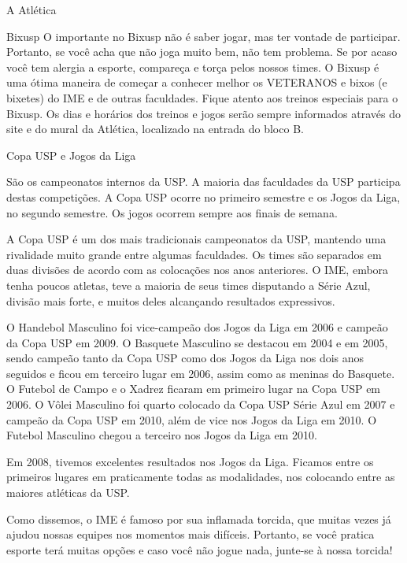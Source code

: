 \begin{secao}{A Atlética}
\begin{subsecao}{Bixusp}
O importante no Bixusp não é saber jogar, mas ter vontade de participar. Portanto, se você acha que não joga muito bem, não tem problema. Se por acaso você tem alergia a esporte, compareça e torça pelos nossos times. O Bixusp é uma ótima maneira de começar a conhecer melhor os VETERANOS e bixos (e bixetes) do IME e de outras faculdades. Fique atento aos treinos especiais para o Bixusp. Os dias e horários dos treinos e jogos serão sempre informados através do site e do mural da Atlética, localizado na entrada do bloco B.

  \end{subsecao}

  \begin{subsecao}{Copa USP e Jogos da Liga}

São os campeonatos internos da USP. A maioria das faculdades da USP participa destas competições. A Copa USP ocorre no primeiro semestre e os Jogos da Liga, no segundo semestre. Os jogos ocorrem sempre aos finais de semana.

A Copa USP é um dos mais tradicionais campeonatos da USP, mantendo uma rivalidade muito grande entre algumas faculdades. Os times são separados em duas divisões de acordo com as colocações nos anos anteriores. O IME, embora tenha poucos atletas, teve a maioria de seus times disputando a Série Azul, divisão mais forte, e muitos deles alcançando resultados expressivos.

O Handebol Masculino foi vice-campeão dos Jogos da Liga em 2006 e campeão da Copa USP em 2009. O Basquete Masculino se destacou em 2004 e em 2005, sendo campeão tanto da Copa USP como dos Jogos da Liga nos dois anos seguidos e ficou em terceiro lugar em 2006, assim como as meninas do Basquete. O Futebol de Campo e o Xadrez ficaram em primeiro lugar na Copa USP em 2006. O Vôlei Masculino foi quarto colocado da Copa USP Série Azul em 2007 e campeão da Copa USP em 2010, além de vice nos Jogos da Liga em 2010. O Futebol Masculino chegou a terceiro nos Jogos da Liga em 2010.

Em 2008, tivemos excelentes resultados nos Jogos da Liga. Ficamos entre os primeiros lugares em praticamente todas as modalidades, nos colocando entre as maiores atléticas da USP.

Como dissemos, o IME é famoso por sua inflamada torcida, que muitas vezes já ajudou nossas equipes nos momentos mais difíceis. Portanto, se você pratica esporte terá muitas opções e caso você não jogue nada, junte-se à nossa torcida!

  \end{subsecao}


\end{secao}
